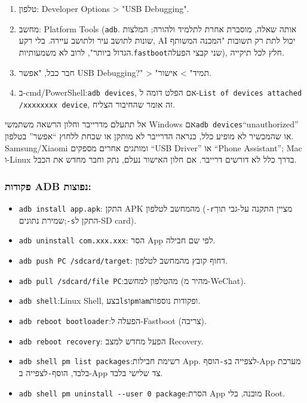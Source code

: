 \begin{enumerate}
  \item טלפון: Developer Options > "USB Debugging".
  \item מחשב: Platform Tools (\texttt{adb}. אותה שאלה, מוסברת אחרת לתלמיד ולהורה; המלצות שונות לתושב עיר ולתושב עיירה. בלי רקע, AI יכול לתת רק תשובות "המכנה המשותף הגדול ביותר", לרוב לא משמעותיות.\texttt{fastboot}שני קבצי הפעלה), חלץ לכל תיקייה.
  \item חבר כבל, "אפשר USB Debugging?" > "תמיד" > אישור.
  \item ב-cmd/PowerShell:\texttt{adb devices}, אם הפלט דומה ל-\texttt{List of devices attached /\allowbreak  xxxxxxxx device}, זה אומר שהחיבור הצליח.
\end{enumerate}

\begin{tcbwarn}{אל תתעלם מדרייבר וחלון הרשאה}
משתמשי Windows אם\texttt{adb devices}“unauthorized” או שהמכשיר לא מופיע כלל, כנראה הדרייבר לא מותקן או שכחת ללחוץ “אפשר” בטלפון. Samsung/Xiaomi ומותגים אחרים מספקים “USB Driver” או “Phone Assistant”; Mac ו-Linux בדרך כלל לא דורשים דרייבר. אם חלון האישור נעלם, נתק וחבר מחדש את הכבל.

\end{tcbwarn}

\subsubsection*{פקודות ADB נפוצות:}

\begin{itemize}
  \item \texttt{adb install app.\allowbreak apk}: התקן APK מהמחשב לטלפון (\texttt{-\allowbreak r}מציין התקנה על-גבי תוך שמירת נתונים;\texttt{-\allowbreak s}התקן ל-SD card).
  \item \texttt{adb uninstall com.\allowbreak xxx.\allowbreak xxx}: הסר App לפי שם חבילה.
  \item \texttt{adb push PC /\allowbreak sdcard/\allowbreak target}: דחוף קובץ מהמחשב לטלפון.
  \item \texttt{adb pull /\allowbreak sdcard/\allowbreak file PC}:מהטלפון למחשב (מהיר מ-WeChat).
  \item \texttt{adb shell}:Linux Shell, בצע\texttt{ls}ו\texttt{pm}ו\texttt{am}ופקודות נוספות.
  \item \texttt{adb reboot bootloader}:הפעלה ל-Fastboot (צריבה).
  \item \texttt{adb reboot recovery}: הפעל מחדש למצב Recovery.
  \item \texttt{adb shell pm list packages}:רשימת חבילות App. הוסף\texttt{-\allowbreak s}לצפייה ב-App מערכת בלבד, הוסף\texttt{-}לצפייה ב-App צד שלישי בלבד.
  \item \texttt{adb shell pm uninstall -\allowbreak -\allowbreak user 0 package}:הסרת App מובנה, בלי Root.
\end{itemize}


